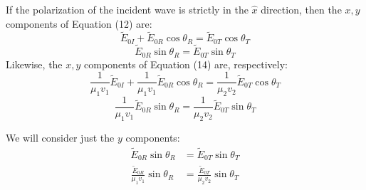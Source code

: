 \documentclass{report}
\begin{document}
\begin{itemize}
\begin{equation}
\end{equation}
If the polarization of the incident wave is strictly in the $\hat{x}$ direction, then the $x,y$ components of Equation (12) are:
\begin{equation}
\tilde{E}_{0I}+\tilde{E}_{0R}\cos{\theta_R} = \tilde{E}_{0T}\cos{\theta_T}
\end{equation}
\begin{equation}
  \tilde{E}_{0R}\sin{\theta_R} = \tilde{E}_{0T}\sin{\theta_T}
\end{equation}
Likewise, the $x,y$ components of Equation (14) are, respectively:
\begin{equation}
\frac{1}{\mu_1v_1}\tilde{E}_{0I}+\frac{1}{\mu_1v_1}\tilde{E}_{0R}\cos{\theta_R} = \frac{1}{\mu_2v_2}\tilde{E}_{0T}\cos{\theta_T}
\end{equation}
\begin{equation}
   \frac{1}{\mu_1v_1}\tilde{E}_{0R}\sin{\theta_R} = \frac{1}{\mu_2v_2}\tilde{E}_{0T}\sin{\theta_T}
\end{equation}

We will consider just the $y$ components:
\begin{align}
    \tilde{E}_{0R}\sin{\theta_R} & = \tilde{E}_{0T}\sin{\theta_T} \\
    \frac{\tilde{E}_{0R}}{\mu_1v_1}\sin{\theta_R} & = \frac{\tilde{E}_{0T}}{\mu_2v_2}\sin{\theta_T}
\end{align}


\end{itemize}
\end{document}
